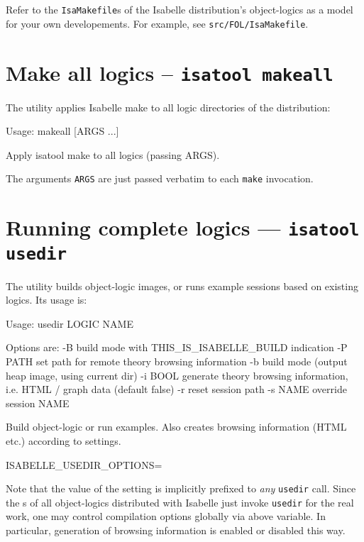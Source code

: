 Refer to the \texttt{IsaMakefile}s of the Isabelle distribution's
object-logics as a model for your own developements.  For example, see
\texttt{src/FOL/IsaMakefile}.


\section{Make all logics -- \texttt{isatool makeall}}

The  utility applies Isabelle make to all logic
directories of the distribution:
\begin{ttbox}
Usage: makeall [ARGS ...]

  Apply isatool make to all logics (passing ARGS).
\end{ttbox}
The arguments \texttt{ARGS} are just passed verbatim to each
\texttt{make} invocation.


\section{Running complete logics --- \texttt{isatool usedir}} \label{sec:tool-usedir}

The  utility builds object-logic images, or runs
example sessions based on existing logics. Its usage is:
\begin{ttbox}
Usage: usedir LOGIC NAME

  Options are:
    -B           build mode with THIS_IS_ISABELLE_BUILD indication
    -P PATH      set path for remote theory browsing information
    -b           build mode (output heap image, using current dir)
    -i BOOL      generate theory browsing information,
                 i.e. HTML / graph data (default false)
    -r           reset session path
    -s NAME      override session NAME

  Build object-logic or run examples. Also creates browsing
  information (HTML etc.) according to settings.

  ISABELLE_USEDIR_OPTIONS=
\end{ttbox}

Note that the value of the  setting is
implicitly prefixed to \emph{any} \texttt{usedir} call. Since the
s of all object-logics distributed with Isabelle
just invoke \texttt{usedir} for the real work, one may control
compilation options globally via above variable. In particular,
generation of  browsing information is enabled or
disabled this way.


